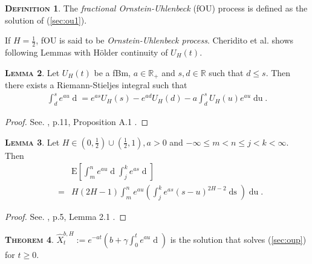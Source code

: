 \documentclass[a4paper, twoside, 11pt]{article}
\theoremstyle{definition}
\newtheorem{definition}{\scshape Definition}[section]
\newtheorem{theorem}[definition]{\scshape Theorem}
\newtheorem{lemma}[definition]{\scshape Lemma}
\newcommand{\brkt}[1]{\left({#1} \right)}
\begin{document}
  \begin{definition}
	The \emph{fractional Ornstein-Uhlenbeck} (fOU) process is defined as the solution of (\ref{sec:ou1}).
  \end{definition}

  If $H=\frac{1}{2}$, fOU is said to be \emph{Ornstein-Uhlenbeck process}. Cheridito et al.\cite{chriel} shows following Lemmas with H\"older continuity of $U_H(t)$.
  \begin{lemma}
	Let $U_H(t)$ be a fBm, $a \in \mathbb{R}_+$ and $s, d\in \mathbb{R}$ such that $d\le s$. Then there exists a Riemann-Stieljes integral such that 
	\begin{eqnarray}
	  \int_d^s e^{au} \mathop{dU_H(u)} = e^{as} U_H(s) - e^{ad} U_H(d) - a\int_d^s U_H(u) e^{au}\mathop{du}.
	  \label{sec:rie}
	\end{eqnarray}
  \end{lemma}

  \begin{proof}
	See. \cite{chriel}, p.11, Proposition A.1 .
  \end{proof}

  \begin{lemma}
	Let $H \in (0, \frac{1}{2}) \cup (\frac{1}{2}, 1), a >0$ and $-\infty\le m < n \le j < k < \infty.$ Then 
	\begin{eqnarray*}
	  &&\mathrm{E}[\int_m^n e^{au}\mathop{dU_H(u)}\int_j^k e^{as}\mathop{dU_H(s)}]\\
	  &=& H(2H-1)\int_m^n e^{au} \brkt{\int_j^k e^{as}(s-u)^{2H-2}\mathop{ds}}\mathop{du}.
  \end{eqnarray*}
	\label{sec:lemma2}
  \end{lemma}

  \begin{proof}
	See. \cite{chriel}, p.5, Lemma 2.1 .
  \end{proof}

  \begin{theorem}
	$\hat{X}^{b,H}_t := e^{-at} \brkt{b + \gamma\int_0^t e^{au}\mathop{dU_H(u)}}$ is the solution that solves (\ref{sec:oup}) for $t\ge 0$.
	\label{sec:sol}
  \end{theorem}
\end{document}
